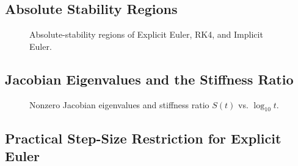 \documentclass[11pt]{article}
\begin{document}
\subsection{Absolute Stability Regions}
\begin{figure}[h]
  \centering
  \caption{Absolute-stability regions of Explicit Euler, RK4, and Implicit Euler.}
  \label{fig:stability-regions}
\end{figure}

\subsection{Jacobian Eigenvalues and the Stiffness Ratio}
\begin{figure}[h]
  \centering
  \caption{Nonzero Jacobian eigenvalues and stiffness ratio $S(t)$ vs. $\log_{10} t$.}
  \label{fig:stiffness-ratio}
\end{figure}

\subsection{Practical Step-Size Restriction for Explicit Euler}

\end{document}

